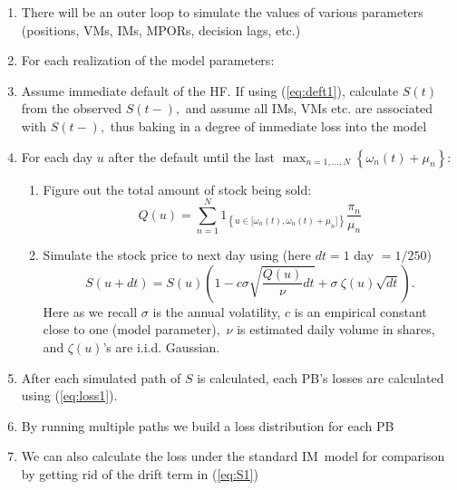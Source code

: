 \documentclass{article}
\begin{document}
\begin{enumerate}
\item There will be an outer loop to simulate the values of various
parameters (positions, VMs, IMs, MPORs, decision lags, etc.)

\item For each realization of the model parameters:

\item Assume immediate default of the HF. If using (\ref{eq:deft1}),
calculate $S(t)$ from the observed $S(t-),$ and assume all IMs, VMs etc. are
associated with $S(t-),$ thus baking in a degree of immediate loss into the
model

\item For each day $u$ after the default until the last $\max_{n=1,\dots
,N}\left\{ \omega _{n}(t)+\mu _{n}\right\} $:

\begin{enumerate}
\item Figure out the total amount of stock being sold:%
\begin{equation*}
Q(u)=\sum_{n=1}^{N}1_{\left\{ u\in \lbrack \omega _{n}(t),\omega _{n}(t)+\mu
_{n}]\right\} }\frac{\pi _{n}}{\mu _{n}}
\end{equation*}

\item Simulate the stock price to next day using (here $dt=1$ day $=1/250$) 
\begin{equation}
S(u+dt)=S(u)\left( 1-c\sigma \sqrt{\frac{Q(u)}{\nu }dt}+\sigma ~\zeta (u)%
\sqrt{dt}\right) .  \label{eq:S1}
\end{equation}%
Here as we recall $\sigma $ is the annual volatility, $c$ is an empirical
constant close to one (model parameter)$,$ $\nu $ is estimated daily volume
in shares, and $\zeta (u)$'s are i.i.d. Gaussian. 
\end{enumerate}

\item After each simulated path of $S$ is calculated, each PB's losses are
calculated using (\ref{eq:loss1}).

\item By running multiple paths we build a loss distribution for each PB

\item We can also calculate the loss under the standard IM\ model for
comparison by getting rid of the drift term in (\ref{eq:S1})
\end{enumerate}
\end{document}
